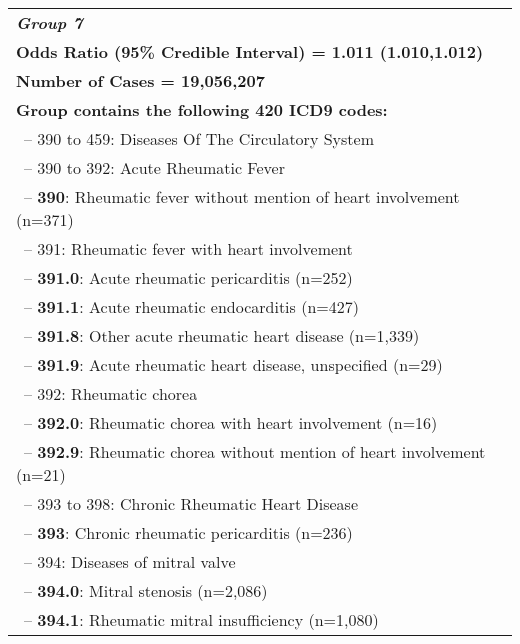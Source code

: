 \begin{longtable}{p{\textwidth}}
 \textbf{\emph{Group 7}}\\ 
\textbf{Odds Ratio (95\% Credible Interval) = 1.011 (1.010,1.012)} \\ \textbf{Number of Cases = 19,056,207} \\ \textbf{Group contains the following 420 ICD9 codes:} \\ \-\ \hspace{ 0pt}\footnotesize{-- 390 to 459: Diseases Of The Circulatory System} \\ \-\ \hspace{10pt}\footnotesize{-- 390 to 392: Acute Rheumatic Fever} \\ \-\ \hspace{20pt}\footnotesize{-- {\color{ForestGreen} \textbf{390}}: Rheumatic fever without mention of heart involvement (n=371)} \\ \-\ \hspace{20pt}\footnotesize{-- 391: Rheumatic fever with heart involvement} \\ \-\ \hspace{30pt}\footnotesize{-- {\color{ForestGreen} \textbf{391.0}}: Acute rheumatic pericarditis (n=252)} \\ \-\ \hspace{30pt}\footnotesize{-- {\color{ForestGreen} \textbf{391.1}}: Acute rheumatic endocarditis (n=427)} \\ \-\ \hspace{30pt}\footnotesize{-- {\color{ForestGreen} \textbf{391.8}}: Other acute rheumatic heart disease (n=1,339)} \\ \-\ \hspace{30pt}\footnotesize{-- {\color{ForestGreen} \textbf{391.9}}: Acute rheumatic heart disease, unspecified (n=29)} \\ \-\ \hspace{20pt}\footnotesize{-- 392: Rheumatic chorea} \\ \-\ \hspace{30pt}\footnotesize{-- {\color{ForestGreen} \textbf{392.0}}: Rheumatic chorea with heart involvement (n=16)} \\ \-\ \hspace{30pt}\footnotesize{-- {\color{ForestGreen} \textbf{392.9}}: Rheumatic chorea without mention of heart involvement (n=21)} \\ \-\ \hspace{10pt}\footnotesize{-- 393 to 398: Chronic Rheumatic Heart Disease} \\ \-\ \hspace{20pt}\footnotesize{-- {\color{ForestGreen} \textbf{393}}: Chronic rheumatic pericarditis (n=236)} \\ \-\ \hspace{20pt}\footnotesize{-- 394: Diseases of mitral valve} \\ \-\ \hspace{30pt}\footnotesize{-- {\color{ForestGreen} \textbf{394.0}}: Mitral stenosis (n=2,086)} \\ \-\ \hspace{30pt}\footnotesize{-- {\color{ForestGreen} \textbf{394.1}}: Rheumatic mitral insufficiency (n=1,080)} \\ 
\end{longtable}

